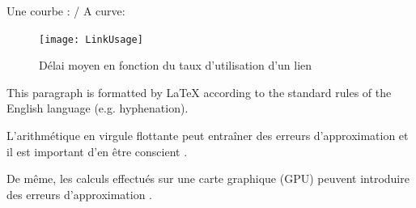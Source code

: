 \clearpage

Une courbe : / A curve:
\begin{figure}[htb]
\centering
\texttt{[image: LinkUsage]}
\caption{Délai moyen en fonction du taux d'utilisation d'un lien}
\label{fig:LinkUse}
\end{figure}

This paragraph is formatted by \LaTeX{} according to the standard rules of the
English language (\mbox{e.g.} hyphenation).

L'arithmétique en virgule flottante peut entraîner des erreurs
d'approximation et il est important d'en être conscient
\cite{Rossi2011}.

De même, les calculs effectués sur une carte graphique (GPU) peuvent
introduire des erreurs d'approximation \cite{DeSantis2002, Cohen2006,
  Thorsson2014, Schirmer2012, Sakai2015, Electrical2006,
  Min2016, Massicotte2013, Kaliouby1987, Daintith2010, Haist2014, Kizza2013,
  Manasreh2011, Brydson1999, Boyce2002}.
